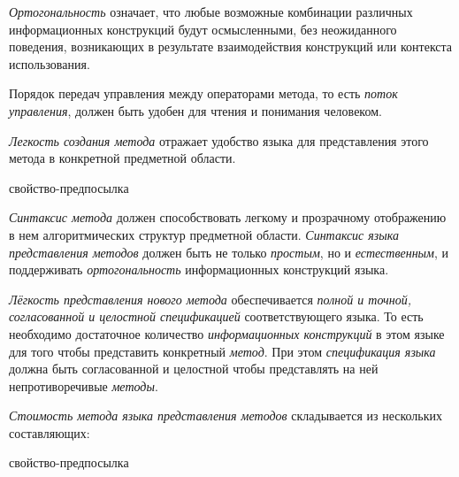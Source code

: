 \textit{Ортогональность} означает, что любые возможные комбинации различных информационных конструкций будут осмысленными, без неожиданного поведения, возникающих в результате взаимодействия конструкций или контекста использования.

Порядок передач управления между операторами метода, то есть \textit{поток управления}, должен быть удобен для чтения и понимания человеком.

\textit{Легкость создания метода} отражает удобство языка для представления этого метода в конкретной предметной области.

\begin{SCn}
\begin{scnrelfromlist}{свойство-предпосылка}
\end{scnrelfromlist}
\end{SCn}

\textit{Синтаксис метода} должен способствовать легкому и прозрачному отображению в нем алгоритмических структур предметной области. \textit{Синтаксис языка представления методов} должен быть не только \textit{простым}, но и \textit{естественным}, и поддерживать \textit{ортогональность} информационных конструкций языка.

\textit{Лёгкость представления нового метода} обеспечивается \textit{полной и точной, согласованной и целостной спецификацией} соответствующего языка. То есть необходимо достаточное количество \textit{информационных конструкций} в этом языке для того чтобы представить конкретный \textit{метод}. При этом \textit{спецификация языка} должна быть согласованной и целостной чтобы представлять на ней непротиворечивые \textit{методы}.

\textit{Стоимость метода языка представления методов} складывается из нескольких составляющих:

\begin{SCn}
\begin{scnrelfromlist}{свойство-предпосылка}
\end{scnrelfromlist}
\end{SCn}

